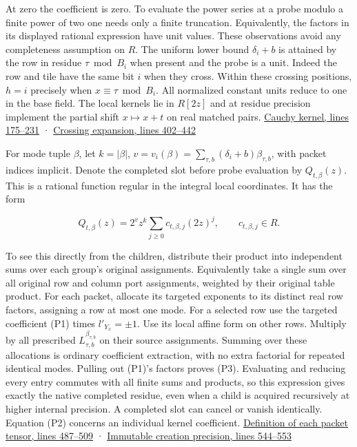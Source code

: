 \documentclass[
  11pt,
]{article}
\begin{document}
At zero the coefficient is zero. To evaluate the power series at a probe
modulo a finite power of two one needs only a finite truncation.
Equivalently, the factors in its displayed rational expression have unit
values. These observations avoid any completeness assumption on \(R\).
The uniform lower bound \(\delta_i+b\) is attained by the row in residue
\(\tau\bmod B_i\) when present and the probe is a unit. Indeed the row
and tile have the same bit \(i\) when they cross. Within these crossing
positions, \(h=i\) precisely when \(x\equiv\tau\bmod B_i\). All
normalized constant units reduce to one in the base field. The local
kernels lie in \(R[2z]\) and at residue precision implement the partial
shift \(x\mapsto x+t\) on real matched pairs.
\href{https://github.com/openai/math/blob/main/preprints/The-Exponential-Time-Hypothesis-is-False-October-25-2026/build/quantitative-contraction.tex\#L175}{Cauchy
kernel, lines 175--231} ·
\href{https://github.com/openai/math/blob/main/preprints/The-Exponential-Time-Hypothesis-is-False-October-25-2026/build/quantitative-contraction.tex\#L402}{Crossing
expansion, lines 402--442}

For mode tuple \(\beta\), let \(k=|\beta|\),
\(v=v_i(\beta)=\sum_{\tau,b}(\delta_i+b)\beta_{\tau,b}\), with packet
indices implicit. Denote the completed slot before probe evaluation by
\(Q_{t,\beta}(z)\). This is a rational function regular in the integral
local coordinates. It has the form

\[
 Q_{t,\beta}(z)=2^v z^k\sum_{j\ge0}c_{t,\beta,j}(2z)^j,
 \qquad c_{t,\beta,j}\in R.
 \tag{P3}
\]

To see this directly from the children, distribute their product into
independent sums over each group's original assignments. Equivalently
take a single sum over all original row and column port assignments,
weighted by their original table product. For each packet, allocate its
targeted exponents to its distinct real row factors, assigning a row at
most one mode. For a selected row use the targeted coefficient (P1)
times \(l'_{Y_x}=\pm1\). Use its local affine form on other rows.
Multiply by all prescribed \(L_{\tau,b}^{\beta_{\tau,b}}\) on their
source assignments. Summing over these allocations is ordinary
coefficient extraction, with no extra factorial for repeated identical
modes. Pulling out (P1)'s factors proves (P3). Evaluating and reducing
every entry commutes with all finite sums and products, so this
expression gives exactly the native completed residue, even when a child
is acquired recursively at higher internal precision. A completed slot
can cancel or vanish identically. Equation (P2) concerns an individual
kernel coefficient.
\href{https://github.com/openai/math/blob/main/preprints/The-Exponential-Time-Hypothesis-is-False-October-25-2026/build/quantitative-contraction.tex\#L487}{Definition
of each packet tensor, lines 487--509} ·
\href{https://github.com/openai/math/blob/main/preprints/The-Exponential-Time-Hypothesis-is-False-October-25-2026/build/quantitative-contraction.tex\#L544}{Immutable
creation precision, lines 544--553}
\end{document}
